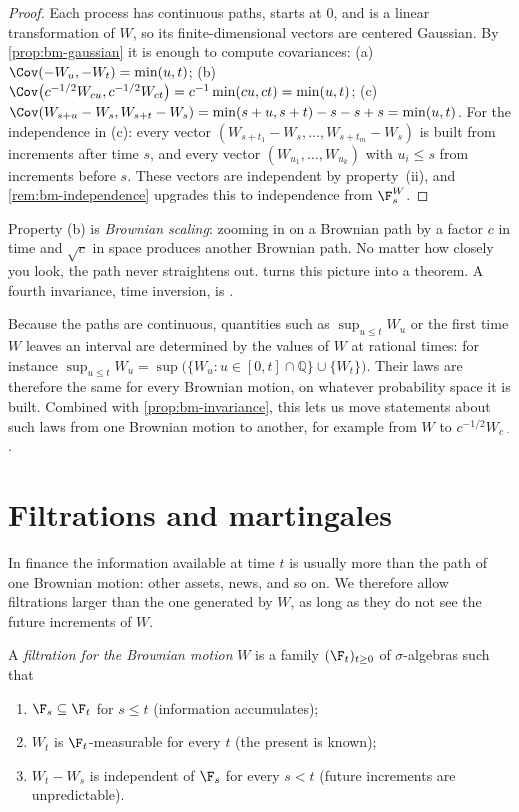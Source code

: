 \begin{proof}
Each process has continuous paths, starts at $0$, and is a linear transformation of $W$,
so its finite-dimensional vectors are centered Gaussian. By
\cref{prop:bm-gaussian} it is enough to compute covariances:
(a) $\Cov(-W_u,-W_t)=\min(u,t)$;
(b) $\Cov\big(c^{-1/2}W_{cu},c^{-1/2}W_{ct}\big)=c^{-1}\min(cu,ct)=\min(u,t)$;
(c) $\Cov(W_{s+u}-W_s,W_{s+t}-W_s)=\min(s+u,s+t)-s-s+s=\min(u,t)$.
For the independence in (c): every vector $(W_{s+t_1}-W_s,\dots,W_{s+t_m}-W_s)$ is built
from increments after time $s$, and every vector $(W_{u_1},\dots,W_{u_k})$ with
$u_i\le s$ from increments before $s$. These vectors are independent by property~(ii),
and \cref{rem:bm-independence} upgrades this to independence from $\F^W_s$.
\end{proof}

Property (b) is \emph{Brownian scaling}: zooming in on a Brownian path by a factor $c$ in
time and $\sqrt c$ in space produces another Brownian path. No matter how closely you
look, the path never straightens out.  turns this picture into a theorem.
A fourth invariance, time inversion, is .

\begin{remark}\label{rem:bm-functionals}
Because the paths are continuous, quantities such as $\sup_{u\le t}W_u$ or the first time
$W$ leaves an interval are determined by the values of $W$ at rational times: for
instance $\sup_{u\le t}W_u=\sup\big(\{W_u:u\in[0,t]\cap\mathbb Q\}\cup\{W_t\}\big)$. Their laws are
therefore the same for every Brownian motion, on whatever probability space it is built.
Combined with \cref{prop:bm-invariance}, this lets us move statements about such laws
from one Brownian motion to another, for example from $W$ to $c^{-1/2}W_{c\,\cdot}$.
\end{remark}

\section{Filtrations and martingales}\label{sec:bm-martingales}

In finance the information available at time $t$ is usually more than the path of one
Brownian motion: other assets, news, and so on. We therefore allow filtrations larger than
the one generated by $W$, as long as they do not see the future increments of $W$.

\begin{definition}\label{def:bm-filtration}
A \emph{filtration for the Brownian motion} $W$ is a family $(\F_t)_{t\ge0}$ of
$\sigma$-algebras such that
\begin{enumerate}[label=(\roman*)]
  \item $\F_s\subseteq\F_t$ for $s\le t$ (information accumulates);
  \item $W_t$ is $\F_t$-measurable for every $t$ (the present is known);
  \item $W_t-W_s$ is independent of $\F_s$ for every $s<t$ (future increments are
    unpredictable).
\end{enumerate}
\end{definition}

